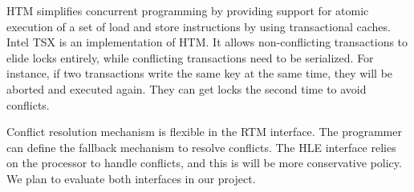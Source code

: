HTM simplifies concurrent programming by providing support for atomic execution of a set of load and store instructions by using transactional caches. Intel TSX is an implementation of HTM. It allows non-conflicting transactions to elide locks entirely, while conflicting transactions need to be serialized. For instance, if two transactions write the same key at the same time, they will be aborted and executed again. They can get locks the second time to avoid conflicts. 

Conflict resolution mechanism is flexible in the RTM interface. The programmer can define the fallback mechanism to resolve conflicts. The HLE interface relies on the processor to handle conflicts, and this is will be more conservative policy. We plan to evaluate both interfaces in our project.